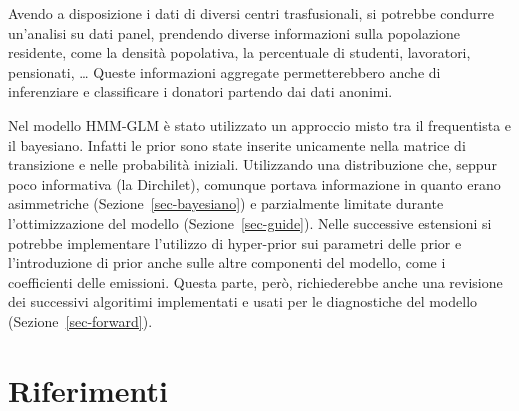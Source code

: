 \documentclass[
  italian,
  a4paper,
  a4paper,
  twoside,
  open=right,
  12pt]{scrbook}
\theoremstyle{definition}
\theoremstyle{remark}
\begin{document}
Avendo a disposizione i dati di diversi centri trasfusionali, si
potrebbe condurre un'analisi su dati panel, prendendo diverse
informazioni sulla popolazione residente, come la densità popolativa, la
percentuale di studenti, lavoratori, pensionati, \ldots{} Queste
informazioni aggregate permetterebbero anche di inferenziare e
classificare i donatori partendo dai dati anonimi.

Nel modello HMM-GLM è stato utilizzato un approccio misto tra il
frequentista e il bayesiano. Infatti le prior sono state inserite
unicamente nella matrice di transizione e nelle probabilità iniziali.
Utilizzando una distribuzione che, seppur poco informativa (la
Dirchilet), comunque portava informazione in quanto erano asimmetriche
(Sezione~\ref{sec-bayesiano}) e parzialmente limitate durante
l'ottimizzazione del modello (Sezione~\ref{sec-guide}). Nelle successive
estensioni si potrebbe implementare l'utilizzo di hyper-prior sui
parametri delle prior e l'introduzione di prior anche sulle altre
componenti del modello, come i coefficienti delle emissioni. Questa
parte, però, richiederebbe anche una revisione dei successivi algoritimi
implementati e usati per le diagnostiche del modello
(Sezione~\ref{sec-forward}).


\chapter*{Riferimenti}\label{riferimenti}
\end{document}
